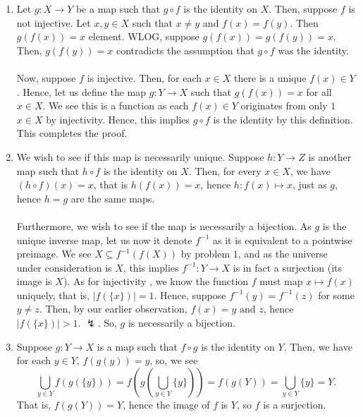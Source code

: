 \documentclass[a4paper]{article}
\begin{document}
\begin{solution}
	\begin{enumerate}
		\item Let \(g: X \to Y\) be a map such that \(g \circ f\) is the identity on \(X\). Then, suppose \(f\) is not injective. Let \(x , y \in X\) such that \(x\neq y\) and \(f\left( x \right)  = f\left( y \right) \). Then \(g\left( f\left( x \right)  \right)  = x \) element. WLOG, suppose \(g\left( f\left( x \right)  \right) = g\left( f\left( y \right)  \right) = x \). Then, \(g\left( f\left( y \right)  \right) =x\) contradicts the assumption that \(g \circ f\) was the identity. \\
		\\	Now, suppose \(f\) is injective. Then, for each \(x \in X\) there is a unique \(f\left( x \right) \in Y\). Hence, let us define the map \(g: Y \to X\) such that \(g\left( f\left( x \right)  \right) = x\) for all \(x \in X\). We see this is a function as each \(f\left( x \right) \in Y \) originates from only \(1\) \(x \in X\) by injectivity. Hence, this implies \(g \circ f\) is the identity by this definition. This completes the proof.
		\item We wish to see if this map is necessarily unique. Suppose \(h: Y \to Z\) is another map such that \(h \circ f\) is the identity on \(X\). Then, for every \(x \in X\), we have \(\left( h \circ f \right) \left( x \right)  = x\), that is \(h\left( f\left( x \right)  \right) = x\), hence \(h: f\left( x  \right) \mapsto x\), just as \(g\), hence \(h = g\) are the same maps.\\
		\\	Furthermore, we wish to see if the map is necessarily a bijection. As \(g\) is the unique inverse map, let us now it denote \(f^{-1}\) as it is equivalent to a pointwise preimage. We see \(X \subseteq f^{-1} \left( f\left( X \right)  \right) \) by problem \(1\), and as the universe under consideration is \(X\), this implies \(f^{-1} : Y \to X\) is in fact a surjection (its image is \(X\)). As for  injectivity , we know the function \(f\) must map \(x \mapsto f\left( x \right) \) uniquely, that is, \(\left| f\left( \{x\}  \right)  \right| = 1\). Hence, suppose \(f^{-1} \left( y \right) = f^{-1} \left( z \right) \) for some \(y \neq z\). Then, by our earlier observation, \(f\left( x \right) = y \text{ and } z \), hence \(\left| f\left( \{x\}  \right)  \right| > 1\). \(\lightning\). So, \(g\) is necessarily a bijection.
\item Suppose \(g:Y \to X\) is a map such that \(f \circ g\) is the identity on \(Y\). Then, we have for each \(y \in Y\), \(f\left( g\left( y \right)  \right) = y\), so, we see \[\bigcup_{y \in Y} f\left( g\left( \{y\}  \right)  \right) = f\left( g\left( \bigcup_{y \in Y} \{y\} \right)   \right) =   f\left( g\left( Y \right)  \right) = \bigcup_{y \in Y} \{y\} = Y.\] That is, \(f\left( g\left( Y \right)  \right) = Y\), hence the image of \(f\) is \(Y\), so \(f\) is a surjection.\\

\end{enumerate}
\end{solution}
\end{document}
